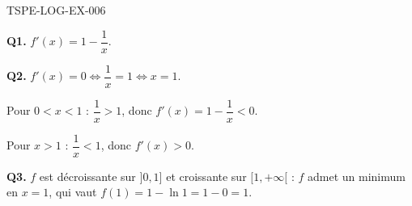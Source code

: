 \begin{corrige}{TSPE-LOG-EX-006}

\textbf{Q1.} $f'(x) = 1 - \dfrac{1}{x}$.

\textbf{Q2.} $f'(x) = 0 \iff \dfrac{1}{x} = 1 \iff x = 1$.

Pour $0 < x < 1$ : $\dfrac{1}{x} > 1$, donc $f'(x) = 1 - \dfrac{1}{x} < 0$.

Pour $x > 1$ : $\dfrac{1}{x} < 1$, donc $f'(x) > 0$.

\textbf{Q3.} $f$ est décroissante sur $]0,1]$ et croissante sur $[1,+\infty[$ : $f$ admet un minimum en $x=1$, qui vaut $f(1) = 1 - \ln 1 = 1 - 0 = 1$.

\end{corrige}
